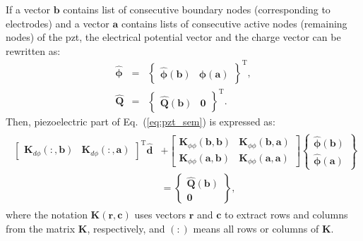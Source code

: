 If a vector \(\textbf{b}\) contains list of consecutive boundary nodes (corresponding to electrodes) and a vector \(\textbf{a}\) contains lists of consecutive active nodes (remaining nodes) of the \ac{pzt}, the electrical potential vector and the charge vector can be rewritten as:
\begin{eqnarray}
	\widehat{\boldsymbol{\phi}} & = & \left \{\begin{array}{cc}
		\widehat{\boldsymbol{\phi}}(\textbf{b}) &
		\widehat{\boldsymbol{\phi}}(\textbf{a})
	\end{array}\right \}^{\mathrm{T}},\\
	\widehat{\textbf{Q}} & = & \left \{\begin{array}{cc}
		\widehat{\textbf{Q}}(\textbf{b}) & \textbf{0}
	\end{array}\right \}^{\mathrm{T}}.
	\label{eq:phi_Q}
\end{eqnarray}
Then, piezoelectric part of Eq.~(\ref{eq:pzt_sem}) is expressed as:
\begin{eqnarray}
	\begin{split}
		\left [\begin{array}{cc}
			\textbf{K}_{d \phi}(:,\textbf{b}) &
			\textbf{K}_{d \phi}(:,\textbf{a})
		\end{array}\right]^{\mathrm{T}}
		\widehat{\textbf{d}} & +
		\left [\begin{array}{cc}
			\textbf{K}_{\phi \phi}(\textbf{b},\textbf{b}) & \textbf{K}_{\phi 		\phi}(\textbf{b},\textbf{a})\\
			\textbf{K}_{\phi \phi}(\textbf{a},\textbf{b}) & \textbf{K}_{\phi \phi}(\textbf{a},\textbf{a})
		\end{array}\right]
		\left \{\begin{array}{c}
			\widehat{\boldsymbol{\phi}}(\textbf{b}) \\
			\widehat{\boldsymbol{\phi}}(\textbf{a})
		\end{array}\right \}\\ 
		& = \left \{\begin{array}{c}
			\widehat{\textbf{Q}}(\textbf{b}) \\
			\textbf{0}
		\end{array}\right \},
	\end{split}
	\label{eq:pztboundary}
\end{eqnarray}
where the notation \(\textbf{K}(\textbf{r},\textbf{c})\) uses vectors \(\textbf{r}\) and \(\textbf{c}\) to extract rows and columns from the matrix \(\textbf{K}\), respectively, and \((:)\) means all rows or columns of \(\textbf{K}\).

